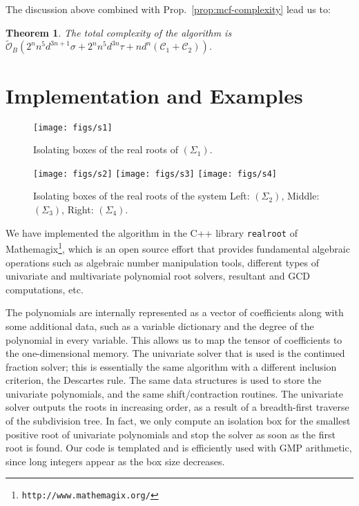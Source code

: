 \documentclass{sig-alternate}
\newtheorem{theorem}{Theorem}[section]
\def\mathemagix{{\sc Mathemagix}}
\newcommand{\sOB}{\ensuremath{\widetilde{\mathcal{O}}_B}\xspace}
\begin{document}
The discussion above combined with Prop.~\ref{prop:mcf-complexity} lead us to:

\begin{theorem}
  \label{th:improved-mcf-complexity}
  The total complexity of the algorithm is 
  $\sOB( 2^n n^5 d^{3n+1} \sigma + 2^{n} n^5 d^{3n} \tau 
  + n d^n( \mathcal{C}_1 + \mathcal{C}_2))$.
\end{theorem}

\section{Implementation and Examples}\label{sec:impl}
\begin{figure}[t]
  \centering
  \texttt{[image: figs/s1]}
  \caption{Isolating boxes of the real roots of $(\Sigma_1)$.}
  \label{fig:sys-1}
\end{figure}

\begin{figure*}[t]
  \centering
  \texttt{[image: figs/s2]}\hfill
  \texttt{[image: figs/s3]}\hfill
  \texttt{[image: figs/s4]}
  \caption{Isolating boxes of the real roots of the system 
    Left: $(\Sigma_2) $, Middle: $(\Sigma_3)$, Right: $(\Sigma_4)$.}
  \label{fig:sys-2}
  \label{fig:sys-3}
  \label{fig:sys-4}
\end{figure*}

We have implemented the algorithm in the C++ library \texttt{realroot} of  
\mathemagix\footnote{\texttt{http://www.mathemagix.org/}},
which is an open source effort that provides fundamental algebraic operations 
such as algebraic number manipulation tools, different types of univariate 
and multivariate polynomial root solvers, resultant and GCD computations, etc.

The polynomials are internally represented as a vector of coefficients
along with some additional data, such as a variable dictionary and the
degree of the polynomial in every variable. This allows us to map the
tensor of coefficients to the one-dimensional memory. The univariate
solver that is used is the continued fraction solver; this is
essentially the same algorithm with a different inclusion criterion,
the Descartes rule. The same data structures is used to store the
univariate polynomials, and the same shift/contraction routines. The
univariate solver outputs the roots in increasing order, as a result
of a breadth-first traverse of the subdivision tree. In fact, we only
compute an isolation box for the smallest positive root of univariate
polynomials and stop the solver as soon as the first root is
found. Our code is templated and is efficiently used with GMP
arithmetic, since long integers appear as the box size decreases.
\end{document}

